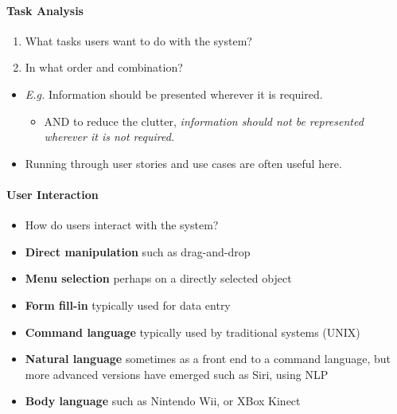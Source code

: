 \documentclass[a4paper]{article}
\providecommand{\tightlist}{%
  \setlength{\itemsep}{0pt}\setlength{\parskip}{0pt}}
\let\oldparagraph\paragraph
\renewcommand{\paragraph}[1]{\oldparagraph{#1}\mbox{}}
\begin{document}
\hypertarget{task-analysis}{%
\paragraph{Task Analysis}\label{task-analysis}}

\begin{enumerate}
\def\labelenumi{\arabic{enumi}.}
\tightlist
\item
  What tasks users want to do with the system?
\item
  In what order and combination?
\end{enumerate}

\begin{itemize}
\tightlist
\item
  \emph{E.g.} Information should be presented wherever it is required.

  \begin{itemize}
  \tightlist
  \item
    AND to reduce the clutter, \emph{information should not be
    represented wherever it is not required.}
  \end{itemize}
\item
  Running through user stories and use cases are often useful here.
\end{itemize}

\hypertarget{user-interaction}{%
\paragraph{User Interaction}\label{user-interaction}}

\begin{itemize}
\item
  How do users interact with the system?
\item
  \textbf{Direct manipulation} such as drag-and-drop
\item
  \textbf{Menu selection} perhaps on a directly selected object
\item
  \textbf{Form fill-in} typically used for data entry
\item
  \textbf{Command language} typically used by traditional systems (UNIX)
\item
  \textbf{Natural language} sometimes as a front end to a command
  language, but more advanced versions have emerged such as Siri, using
  NLP
\item
  \textbf{Body language} such as Nintendo Wii, or XBox Kinect
\end{itemize}
\end{document}

